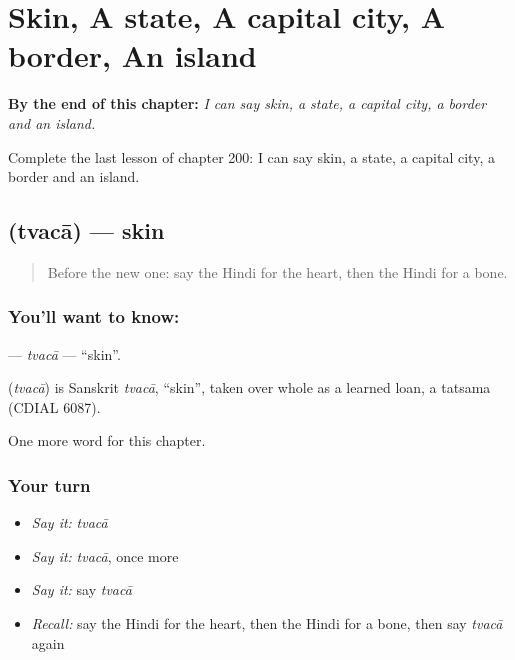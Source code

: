 
\chapter{Skin, A state, A capital city, A border, An island}
\label{ch:hi-skin-a-state-a-capital-city-a-border-an-island}

\begin{chapteropening}
\textbf{By the end of this chapter:} \emph{I can say skin, a state, a capital city, a border and an island.}

Complete the last lesson of chapter 200: I can say skin, a state, a capital city, a border and an island.
\end{chapteropening}

\section[\texorpdfstring{\hi{त्वचा} (tvacā)}{त्वचा (tvacā)}]{ (tvacā) — skin}

\label{lesson:HI-C200-tvaca}



\begin{quote}
Before the new one: say the Hindi for the heart, then the Hindi for a bone.
\end{quote}

\subsection*{You'll want to know: }
\textbf{} — \emph{tvacā} — \textquotedblleft{}skin\textquotedblright{}.

\begin{cousinweb}
\textbf{} (\emph{tvacā}) is Sanskrit \emph{tvacā}, \textquotedblleft{}skin\textquotedblright{}, taken over whole as a learned loan, a tatsama (CDIAL 6087).
\end{cousinweb}

\begin{grammarlens}[title={What you've built}]
One more word for this chapter.
\end{grammarlens}

\subsection*{Your turn}
\begin{itemize}
\raggedright
  \item \emph{Say it:} \emph{tvacā}
  \item \emph{Say it:} \emph{tvacā}, once more
  \item \emph{Say it:} say \emph{tvacā}
  \item \emph{Recall:} say the Hindi for the heart, then the Hindi for a bone, then say \emph{tvacā} again
\end{itemize}

